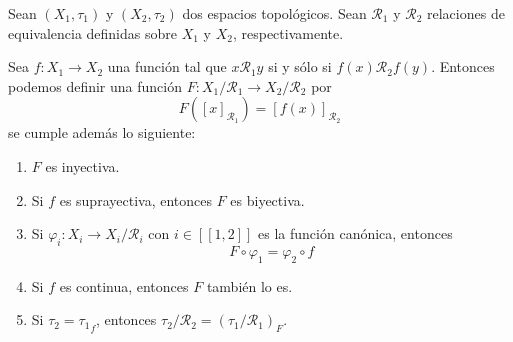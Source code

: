 \documentclass[12pt]{report}
\theoremstyle{largebreak}
\newcommand\cf[3]{\ensuremath{#1:#2\rightarrow#3}}
\newcommand{\natint}[1]{\ensuremath{\left[\!\left[#1\right]\!\right]}}
\begin{document}
    \begin{propo}
        Sean $(X_1,\tau_1)$ y $(X_2,\tau_2)$ dos espacios topológicos. Sean $\mathcal{R}_1$ y $\mathcal{R}_2$ relaciones de equivalencia definidas sobre $X_1$ y $X_2$, respectivamente.

        Sea $\cf{f}{X_1}{X_2}$ una función tal que $x\mathcal{R}_1y$ si y sólo si $f(x)\mathcal{R}_2f(y)$. Entonces podemos definir una función $\cf{F}{X_1/\mathcal{R}_1}{X_2/\mathcal{R}_2}$ por
        \begin{equation*}
            F([x]_{\mathcal{R}_1})=[f(x)]_{\mathcal{R}_2}
        \end{equation*}
        se cumple además lo siguiente:
        \begin{enumerate}
            \item $F$ es inyectiva.
            \item Si $f$ es suprayectiva, entonces $F$ es biyectiva.
            \item Si $\cf{\varphi_i}{X_i}{X_i/\mathcal{R}_i}$ con $i\in\natint{1,2}$ es la función canónica, entonces
            \begin{equation*}
                F\circ\varphi_1=\varphi_2\circ f
            \end{equation*}
            \item Si $f$ es continua, entonces $F$ también lo es.
            \item Si $\tau_2={\tau_1}_f$, entonces $\tau_2/\mathcal{R}_2=\left(\tau_1/\mathcal{R}_1\right)_F$.
        \end{enumerate}
    \end{propo}
\end{document}
